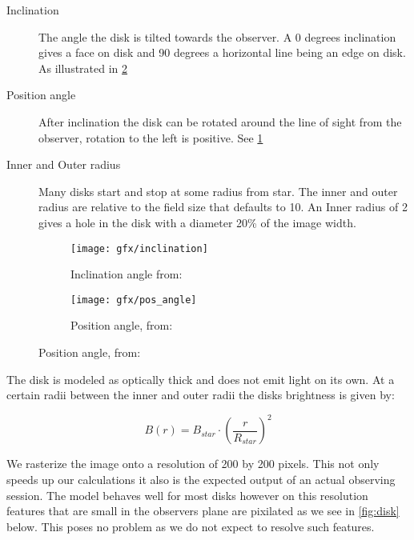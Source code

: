 \begin{description}
\item[Inclination] The angle the disk is tilted towards the observer. A 0 degrees inclination gives a face on disk and 90 degrees a horizontal line being an edge on disk. As illustrated in \ref{fig:inclination}
\item[Position angle] After inclination the disk can be rotated around the line of sight from the observer, rotation to the left is positive. See \ref{fig:pos_angle}
\item[Inner and Outer radius] Many disks start and stop at some radius from star. The inner and outer radius are relative to the field size that defaults to 10. An Inner radius of 2 gives a hole in the disk with a diameter 20\% of the image width. 
\end{description}

\begin{figure}[h!]
  \centering
  \begin{subfigure}[b]{0.4\textwidth}
    \texttt{[image: gfx/inclination]}\label{fig:pos_angle}
    \caption{Inclination angle from: \cite{Pieter_Okko}}

  \end{subfigure}
  \begin{subfigure}[b]{0.4\textwidth}
    \texttt{[image: gfx/pos\_angle]}\label{fig:inclination}
    \caption{Position angle, from: \cite{Pieter_Okko}}
  \end{subfigure}
  \label{fig:1}
\end{figure}

The disk is modeled as optically thick and does not emit light on its own. At a certain radii between the inner and outer radii the disks brightness is given by:

\begin{equation}
B(r) = B_{star} \cdot {\left(\frac{r}{R_{star}}\right)}^2
\end{equation}

We rasterize the image onto a resolution of 200 by 200 pixels. This not only speeds up our calculations it also is the expected output of an actual observing session. The model behaves well for most disks however on this resolution features that are small in the observers plane are pixilated as we see in \autoref{fig:disk} below. This poses no problem as we do not expect to resolve such features.

